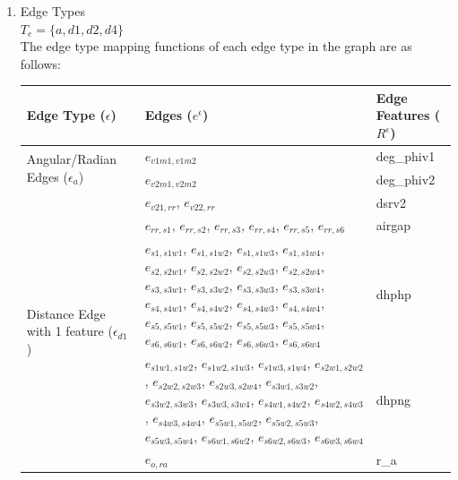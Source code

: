 \documentclass{report} %
\begin{document}
\begin{enumerate}
    \item Edge Types \\
    \( T_e = \{ a, d1, d2, d4\} \)\\
    The edge type mapping functions of each edge type in the graph are as follows: \\

    \begin{table}[H]
        \centering
        \begin{tabular}{|p{}|p{}|p{}|}
        \hline 
        {\bf Edge Type (\(\epsilon\))} & {\bf Edges (\( e^{\epsilon} \))} & {\bf Edge Features (\( R^{\epsilon}\))}  \\
        \hline
        \multirow{2}{0.2\textwidth}{Angular/Radian Edges (\( \epsilon_a \))} & \( e_{v1m1, v1m2} \) & deg\_phiv1 \\
                                                                & \( e_{v2m1, v2m2} \) & deg\_phiv2 \\
        \hline
        \multirow{5}{0.2\textwidth}{Distance Edge with 1 feature (\( \epsilon_{d1} \))} & \( e_{v21,rr} \), \( e_{v22,rr} \) & dsrv2 \\
                    & \( e_{rr,s1} \), \( e_{rr,s2} \), \( e_{rr,s3} \), \( e_{rr,s4} \), \( e_{rr,s5} \), \( e_{rr,s6} \) & airgap \\
                    & \( e_{s1,s1w1} \), \( e_{s1,s1w2} \), \( e_{s1,s1w3} \), \( e_{s1,s1w4} \), \( e_{s2,s2w1} \), \( e_{s2,s2w2} \),
                    \( e_{s2,s2w3} \), \( e_{s2,s2w4} \), \( e_{s3,s3w1} \), \( e_{s3,s3w2} \), \( e_{s3,s3w3} \), \( e_{s3,s3w4} \),
                    \( e_{s4,s4w1} \), \( e_{s4,s4w2} \), \( e_{s4,s4w3} \), \( e_{s4,s4w4} \), \( e_{s5,s5w1} \), \( e_{s5,s5w2} \),
                    \( e_{s5,s5w3} \), \( e_{s5,s5w4} \), \( e_{s6,s6w1} \), \( e_{s6,s6w2} \), \( e_{s6,s6w3} \), \( e_{s6,s6w4} \) & dhphp \\
                    &\( e_{s1w1,s1w2} \), \( e_{s1w2,s1w3} \), \( e_{s1w3,s1w4} \), \( e_{s2w1,s2w2} \), \( e_{s2w2,s2w3} \), \( e_{s2w3,s2w4} \),
                    \( e_{s3w1,s3w2} \), \( e_{s3w2,s3w3} \), \( e_{s3w3,s3w4} \), \( e_{s4w1,s4w2} \), \( e_{s4w2,s4w3} \), \( e_{s4w3,s4w4} \), 
                    \( e_{s5w1,s5w2} \), \( e_{s5w2,s5w3} \), \( e_{s5w3,s5w4} \), \( e_{s6w1,s6w2} \), \( e_{s6w2,s6w3} \), \( e_{s6w3,s6w4} \) & dhpng \\
                    &\( e_{o,ra} \) & r\_a \\
        

\end{tabular}
\end{table}
\end{enumerate}
\end{document}
